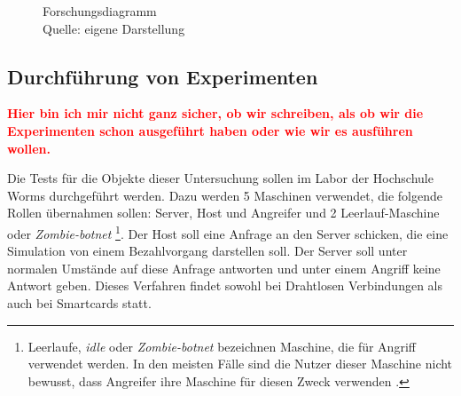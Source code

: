 \begin{figure}[H]
  \caption{Forschungsdiagramm
  \\ Quelle: eigene Darstellung}
  \label{fig:FD}
\end{figure}




\subsection{Durchführung von Experimenten}
\textcolor{red}{\textbf{Hier bin ich mir nicht ganz sicher, ob wir schreiben, als ob wir die Experimenten 
schon ausgeführt haben oder wie wir es ausführen wollen.}}

Die Tests für die Objekte dieser Untersuchung sollen im Labor der Hochschule Worms durchgeführt werden. 
Dazu werden 5 Maschinen verwendet, die folgende Rollen übernahmen sollen: Server, Host und Angreifer und 2
Leerlauf-Maschine oder \textit{Zombie-botnet} \footnote{Leerlaufe, \textit{idle} oder \textit{Zombie-botnet} 
bezeichnen Maschine, die für Angriff verwendet werden. In den meisten Fälle sind die Nutzer dieser Maschine nicht
bewusst, dass Angreifer ihre Maschine für diesen Zweck verwenden \cite{refart:XGDD}.}. Der Host soll eine 
Anfrage an den Server schicken, die eine Simulation von einem Bezahlvorgang darstellen soll. Der Server 
soll unter normalen Umstände auf diese Anfrage antworten und unter einem Angriff keine Antwort geben.
Dieses Verfahren findet sowohl bei Drahtlosen Verbindungen als auch bei Smartcards statt.


